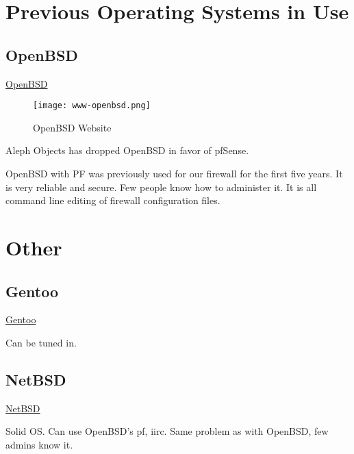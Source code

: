 \section{Previous Operating Systems in Use}
\subsection{OpenBSD}
\href{https://www.openbsd.org/}{OpenBSD}

\begin{figure}[h!]
\texttt{[image: www-openbsd.png]}
 \caption{OpenBSD Website}
 \label{fig:www-openbsd}
\end{figure}

Aleph Objects has dropped OpenBSD in favor of pfSense.

OpenBSD with PF was previously used for our firewall for the first five years.
It is very reliable and secure. Few people know how to administer it. It is
all command line editing of firewall configuration files.


\section{Other}
\subsection{Gentoo}
 \href{https://www.gentoo.org/}{Gentoo}

Can be tuned in.



\subsection{NetBSD}
 \href{https://www.netbsd.org/}{NetBSD}

Solid OS. Can use OpenBSD's pf, iirc. Same problem as with OpenBSD, few admins know it.



